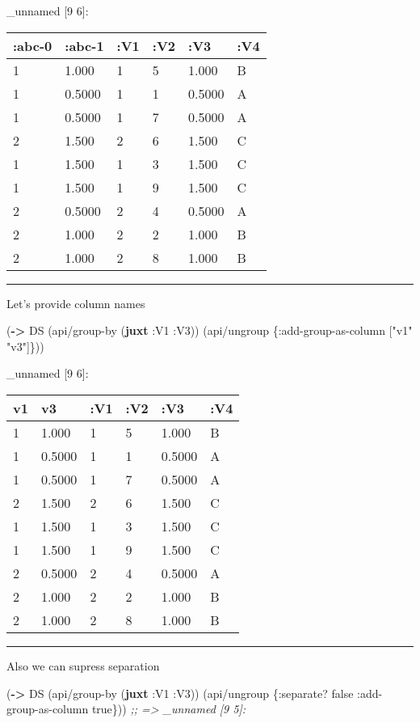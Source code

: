 \documentclass[]{article}
\newenvironment{Shaded}{\begin{snugshade}}{\end{snugshade}}
\newcommand{\KeywordTok}[1]{\textcolor[rgb]{0.13,0.29,0.53}{\textbf{#1}}}
\newcommand{\StringTok}[1]{\textcolor[rgb]{0.31,0.60,0.02}{#1}}
\newcommand{\CommentTok}[1]{\textcolor[rgb]{0.56,0.35,0.01}{\textit{#1}}}
\newcommand{\VariableTok}[1]{\textcolor[rgb]{0.00,0.00,0.00}{#1}}
\newcommand{\AttributeTok}[1]{\textcolor[rgb]{0.77,0.63,0.00}{#1}}
\newcommand{\NormalTok}[1]{#1}
\begin{document}
\_unnamed {[}9 6{]}:

\begin{longtable}[]{@{}llllll@{}}
\toprule
:abc-0 & :abc-1 & :V1 & :V2 & :V3 & :V4\tabularnewline
\midrule
\endhead
1 & 1.000 & 1 & 5 & 1.000 & B\tabularnewline
1 & 0.5000 & 1 & 1 & 0.5000 & A\tabularnewline
1 & 0.5000 & 1 & 7 & 0.5000 & A\tabularnewline
2 & 1.500 & 2 & 6 & 1.500 & C\tabularnewline
1 & 1.500 & 1 & 3 & 1.500 & C\tabularnewline
1 & 1.500 & 1 & 9 & 1.500 & C\tabularnewline
2 & 0.5000 & 2 & 4 & 0.5000 & A\tabularnewline
2 & 1.000 & 2 & 2 & 1.000 & B\tabularnewline
2 & 1.000 & 2 & 8 & 1.000 & B\tabularnewline
\bottomrule
\end{longtable}

\begin{center}\rule{0.5\linewidth}{0.5pt}\end{center}

Let's provide column names

\begin{Shaded}
\begin{Highlighting}[]
\NormalTok{(}\KeywordTok{->}\NormalTok{ DS}
\NormalTok{    (api/group-by (}\KeywordTok{juxt} \AttributeTok{:V1} \AttributeTok{:V3}\NormalTok{))}
\NormalTok{    (api/ungroup \{}\AttributeTok{:add-group-as-column}\NormalTok{ [}\StringTok{"v1"} \StringTok{"v3"}\NormalTok{]\}))}
\end{Highlighting}
\end{Shaded}

\_unnamed {[}9 6{]}:

\begin{longtable}[]{@{}llllll@{}}
\toprule
v1 & v3 & :V1 & :V2 & :V3 & :V4\tabularnewline
\midrule
\endhead
1 & 1.000 & 1 & 5 & 1.000 & B\tabularnewline
1 & 0.5000 & 1 & 1 & 0.5000 & A\tabularnewline
1 & 0.5000 & 1 & 7 & 0.5000 & A\tabularnewline
2 & 1.500 & 2 & 6 & 1.500 & C\tabularnewline
1 & 1.500 & 1 & 3 & 1.500 & C\tabularnewline
1 & 1.500 & 1 & 9 & 1.500 & C\tabularnewline
2 & 0.5000 & 2 & 4 & 0.5000 & A\tabularnewline
2 & 1.000 & 2 & 2 & 1.000 & B\tabularnewline
2 & 1.000 & 2 & 8 & 1.000 & B\tabularnewline
\bottomrule
\end{longtable}

\begin{center}\rule{0.5\linewidth}{0.5pt}\end{center}

Also we can supress separation

\begin{Shaded}
\begin{Highlighting}[]
\NormalTok{(}\KeywordTok{->}\NormalTok{ DS}
\NormalTok{    (api/group-by (}\KeywordTok{juxt} \AttributeTok{:V1} \AttributeTok{:V3}\NormalTok{))}
\NormalTok{    (api/ungroup \{}\AttributeTok{:separate}\NormalTok{? }\VariableTok{false}
                  \AttributeTok{:add-group-as-column} \VariableTok{true}\NormalTok{\}))}
\CommentTok{;; => _unnamed [9 5]:}
\end{Highlighting}
\end{Shaded}
\end{document}
